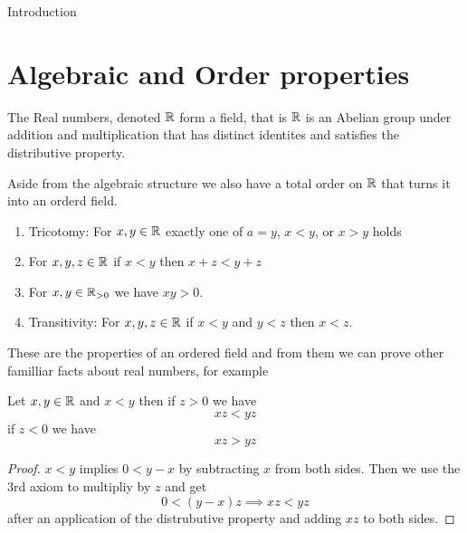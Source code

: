 \begin{chapter}{Introduction}
    \section{Algebraic and Order properties}
    The Real numbers, denoted $\mathbb{R}$ form a field, that is $\mathbb{R}$ is an Abelian group under addition and multiplication that 
    has distinct identites and satisfies the distributive property.

    Aside from the algebraic structure we also have a total order on $\mathbb{R}$ that turns it into an orderd field. 
    
    \begin{enumerate}
        \item Tricotomy: For $x, y \in \mathbb{R}$ exactly one of $a=y$, $x<y$, or $x>y$ holds
        \item For $x,y,z \in \mathbb{R}$ if $x < y$ then $x + z < y + z$ 
        \item For $x, y \in \mathbb{R}_{>0}$ we have $xy > 0$. 
        \item Transitivity: For $x, y, z \in \mathbb{R}$ if $x < y$ and $y < z$ then $x < z$. 
    \end{enumerate}

    These are the properties of an ordered field and from them we can prove other familliar facts about real numbers, for example 

    
    \begin{lem}
        Let $x, y \in \mathbb{R}$ and $x < y$ then if $z > 0$ we have 
        \[xz < yz\]
        if $z < 0$ we have 
        \[xz > yz\]
    \end{lem}

    
    \begin{proof}
        $x < y$ implies $0 < y - x$ by subtracting $x$ from both sides. Then we use the 3rd axiom to multipliy by $z$ and get 
        \[0 < (y - x)z \implies xz < yz\]
        after an application of the distrubutive property and adding $xz $ to both sides. 
    \end{proof}

    

\end{chapter}